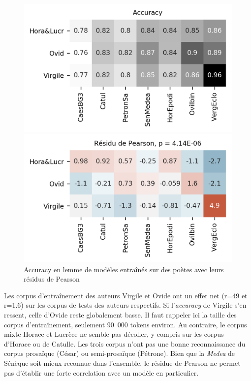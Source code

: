 \begin{figure}[ht]
    \hspace*{-0.05\linewidth}
    \begin{minipage}[c]{0.55\linewidth}
        \includegraphics[width=1\linewidth]{results/lemmatisation/longreeVariante/LongreeVariante-AccuracyStyleDePoesie-Lemme.png}
    \end{minipage} \hfill
    \begin{minipage}[c]{0.55\linewidth}
        \includegraphics[width=1\linewidth]{results/lemmatisation/longreeVariante/LongreeVariante-AssocPlotStyleDePoesie-Lemme.png}
    \end{minipage}
    \caption{Accuracy en lemme de modèles entraînés sur des poètes avec leurs résidus de Pearson}
    \label{fig:lemmatisation:longree:poetes}
\end{figure}

Les corpus d'entraînement des auteurs Virgile et Ovide ont un effet net (r=49 et r=1.6) sur les corpus de tests des auteurs respectifs. Si l'\textit{accuracy} de Virgile s'en ressent, celle d'Ovide reste globalement basse. Il faut rappeler ici la taille des corpus d'entraînement, seulement 90~000 tokens environ. Au contraire, le corpus mixte Horace et Lucrèce ne semble pas décoller, y compris sur les corpus d'Horace ou de Catulle. Les trois corpus n'ont pas une bonne reconnaissance du corpus prosaïque (César) ou semi-prosaïque (Pétrone). Bien que la \textit{Medea} de Sénèque soit mieux reconnue dans l'ensemble, le résidue de Pearson ne permet pas d'établir une forte correlation avec un modèle en particulier.

